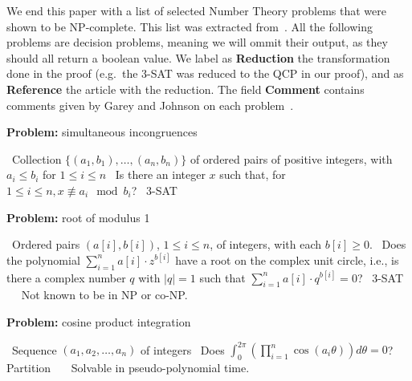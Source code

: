 \documentclass{amsart}
\theoremstyle{plain}
\begin{document}
We end this paper with a list of selected Number Theory problems that were shown to be NP-complete.
This list was extracted from~\cite{garey-johnson}. All the following problems are decision
problems, meaning we will ommit their output, as they should all return a boolean value.  We label
as \textbf{Reduction} the transformation done in the proof (e.g.\ the 3-SAT was reduced to the QCP
in our proof), and as \textbf{Reference} the article with the reduction. The field \textbf{Comment}
contains comments given by Garey and Johnson on each problem~\cite{garey-johnson}.

\begin{algorithm}[h]
  \caption*{\textbf{Problem:} simultaneous incongruences}
  \begin{algorithmic}[1]
    \Require\, Collection $\{(a_1,b_1),\ldots,(a_n,b_n)\}$ of ordered pairs of positive integers,
    with $a_i\leq b_i$ for $1\leq i\leq n$
    \Description\, Is there an integer $x$ such that, for $1\leq i\leq n, x\not\equiv a_i\mod b_i$?
    \Reduction\, 3-SAT
    \Reference\,~\cite{stockmeyer-meyer}
  \end{algorithmic}
\end{algorithm}

\begin{algorithm}[h]
  \caption*{\textbf{Problem:} root of modulus 1}
  \begin{algorithmic}[1]
    \Require\, Ordered pairs $(a[i],b[i])$, $1\leq i\leq n$, of integers, with each $b[i]\geq 0$.
    \Description\, Does the polynomial $\sum_{i=1}^n a[i]\cdot z^{b[i]}$ have a root on the complex
    unit circle, i.e., is there a complex number $q$ with $|q|=1$ such that $\sum_{i=1}^n a[i]\cdot
    q^{b[i]}=0$?
    \Reduction\, 3-SAT
    \Reference\,~\cite{plaisted-77b}
    \Commentx\, Not known to be in NP or co-NP\@.
  \end{algorithmic}
\end{algorithm}

\begin{algorithm}[h]
  \caption*{\textbf{Problem:} cosine product integration}
  \begin{algorithmic}[1]
    \Require\, Sequence $(a_1,a_2,\ldots,a_n)$ of integers
    \Description\, Does $\int_0^{2\pi}(\prod_{i=1}^n \cos(a_i\theta))d\theta=0$?
    \Reduction\, Partition
    \Reference\,~\cite{plaisted-76}
    \Commentx\, Solvable in pseudo-polynomial time.
  \end{algorithmic}
\end{algorithm}
\end{document}
